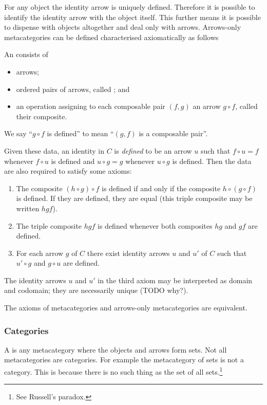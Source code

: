 For any object the identity arrow is uniquely defined. Therefore it is possible to identify the identity arrow with the object itself. This further means it is possible to dispense with objects altogether and deal only with arrows. Arrows-only metacategories can be defined characterised axiomatically as follows
\begin{definition}
An  consists of
\begin{itemize}
\item arrows;
\item ordered pairs of arrows, called ; and
\item an operation assigning to each composable pair $(f,g)$ an arrow $g\circ f$, called their composite.
\end{itemize}
We say ``$g \circ f$ is defined'' to mean ``$(g,f)$ is a composable pair''.

Given these data, an identity in $C$ is \textit{defined} to be an arrow $u$ such that $f\circ u = f$ whenever $f\circ u$ is defined and $u\circ g = g$ whenever $u\circ g$ is defined. Then the data are also required to satisfy some axioms:
\begin{enumerate}
\item The composite $(h \circ g)\circ f$ is defined if and only if the composite $h\circ (g \circ f)$ is defined. If they are defined, they are equal (this triple composite may be written $hgf$).
\item The triple composite $hgf$ is defined whenever both composites $hg$ and $gf$ are defined.
\item For each arrow $g$ of $C$ there exist identity arrows $u$ and $u'$ of $C$ such that $u'\circ g$ and $g\circ u$ are defined.
\end{enumerate}
\end{definition}
The identity arrows $u$ and $u'$ in the third axiom may be interpreted as domain and codomain; they are necessarily unique (TODO why?).

\begin{eigenschap}
The axioms of metacategories and arrows-only metacategories are equivalent.
\end{eigenschap}

\subsubsection{Categories}
A  is any metacategory where the objects and arrows form sets. Not all metacategories are categories. For example the metacategory of sets is not a category. This is because there is no such thing as the set of all sets.\footnote{See Russell's paradox.}

